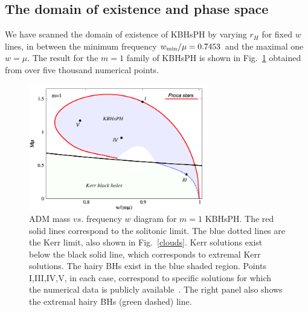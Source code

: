 \subsection{The domain of existence and phase space}
\label{subsec_III}
We have scanned the domain of existence of KBHsPH by varying $r_H$ for fixed $w$ lines, 
in between the minimum frequency 
$w_{\rm min}/\mu=0.7453$ and the maximal one $w=\mu$. 
The result for the $m=1$ family of KBHsPH is shown in Fig.~\ref{figdomain} obtained from over five thousand numerical points. 


%
\begin{figure}[h!]
  \begin{center}
    \includegraphics[width=0.7\textwidth]{papers/Proca/BH-w-M-with-points.pdf}
  \end{center}
  \caption{ADM mass $vs.$ frequency $w$ diagram for $m=1$ KBHsPH. The red solid lines correspond to the solitonic limit. The blue dotted lines are the Kerr limit, also shown in Fig.~\ref{clouds}. Kerr solutions exist below the black solid line, which corresponds to extremal Kerr solutions. The hairy BHs exist in the blue shaded region. Points I,III,IV,V, in each case, correspond to specific solutions for which the numerical data is publicly available~\cite{datakbhph,datakbhsh}. The right panel also shows the extremal hairy BHs (green dashed) line.}
  \label{figdomain}
\end{figure}
%

